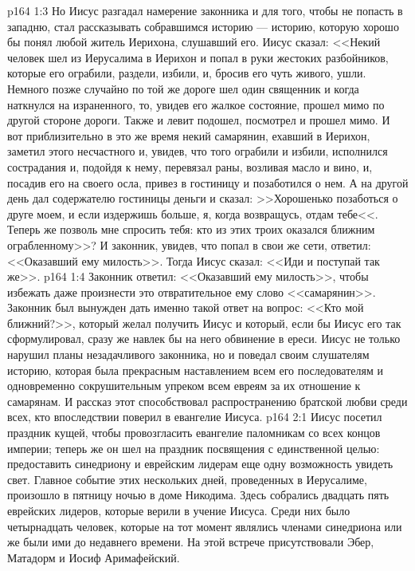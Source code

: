 \vs p164 1:3 Но Иисус разгадал намерение законника и для того, чтобы не попасть в западню, стал рассказывать собравшимся историю --- историю, которую хорошо бы понял любой житель Иерихона, слушавший его. Иисус сказал: <<Некий человек шел из Иерусалима в Иерихон и попал в руки жестоких разбойников, которые его ограбили, раздели, избили, и, бросив его чуть живого, ушли. Немного позже случайно по той же дороге шел один священник и когда наткнулся на израненного, то, увидев его жалкое состояние, прошел мимо по другой стороне дороги. Также и левит подошел, посмотрел и прошел мимо. И вот приблизительно в это же время некий самарянин, ехавший в Иерихон, заметил этого несчастного и, увидев, что того ограбили и избили, исполнился сострадания и, подойдя к нему, перевязал раны, возливая масло и вино, и, посадив его на своего осла, привез в гостиницу и позаботился о нем. А на другой день дал содержателю гостиницы деньги и сказал: >>Хорошенько позаботься о друге моем, и если издержишь больше, я, когда возвращусь, отдам тебе<<. Теперь же позволь мне спросить тебя: кто из этих троих оказался ближним ограбленному>>? И законник, увидев, что попал в свои же сети, ответил: <<Оказавший ему милость>>. Тогда Иисус сказал: <<Иди и поступай так же>>.
\vs p164 1:4 Законник ответил: <<Оказавший ему милость>>, чтобы избежать даже произнести это отвратительное ему слово <<самарянин>>. Законник был вынужден дать именно такой ответ на вопрос: <<Кто мой ближний?>>, который желал получить Иисус и который, если бы Иисус его так сформулировал, сразу же навлек бы на него обвинение в ереси. Иисус не только нарушил планы незадачливого законника, но и поведал своим слушателям историю, которая была прекрасным наставлением всем его последователям и одновременно сокрушительным упреком всем евреям за их отношение к самарянам. И рассказ этот способствовал распространению братской любви среди всех, кто впоследствии поверил в евангелие Иисуса.
\vs p164 2:1 Иисус посетил праздник кущей, чтобы провозгласить евангелие паломникам со всех концов империи; теперь же он шел на праздник посвящения с единственной целью: предоставить синедриону и еврейским лидерам еще одну возможность увидеть свет. Главное событие этих нескольких дней, проведенных в Иерусалиме, произошло в пятницу ночью в доме Никодима. Здесь собрались двадцать пять еврейских лидеров, которые верили в учение Иисуса. Среди них было четырнадцать человек, которые на тот момент являлись членами синедриона или же были ими до недавнего времени. На этой встрече присутствовали Эбер, Матадорм и Иосиф Аримафейский.
